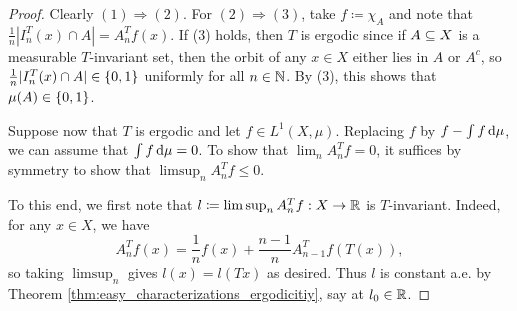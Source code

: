 \documentclass[reqno, twoside]{article}
\begin{document}
    \begin{proof}
        Clearly $(1)\Rightarrow(2)$. For $(2)\Rightarrow(3)$, take $f\coloneqq\chi_A$ and note that $\frac{1}{n}|I_n^T(x)\cap A|=A_n^Tf(x)$. If (3) holds, then $T$ is ergodic since if $A\subseteq X$ is a measurable $T$-invariant set, then the orbit of any $x\in X$ either lies in $A$ or $A^c$, so $\frac{1}{n}|I_n^T(x)\cap A|\in\left\{0,1\right\}$ uniformly for all $n\in\mathbb{N}$. By (3), this shows that $\mu(A)\in\left\{0,1\right\}$.

        Suppose now that $T$ is ergodic and let $f\in L^1(X,\mu)$. Replacing $f$ by $f-\int f\,\mathrm{d}\mu$, we can assume that $\int f\,\mathrm{d}\mu=0$. To show that $\lim_nA_n^Tf=0$, it suffices by symmetry to show that $\limsup_nA_n^Tf\leq0$.

        To this end, we first note that $l\coloneqq\limsup_nA_n^Tf:X\to\mathbb{R}$ is $T$-invariant. Indeed, for any $x\in X$, we have
        \vspace{-0.05in}
        \begin{equation*}
            A_n^Tf(x)=\frac{1}{n}f(x)+\frac{n-1}{n}A_{n-1}^Tf(T(x)),
        \end{equation*}
        so taking $\limsup_n$ gives $l(x)=l(Tx)$ as desired. Thus $l$ is constant a.e. by Theorem \ref{thm:easy_characterizations_ergodicitiy}, say at $l_0\in\mathbb{R}$.


\end{proof}
\end{document}
